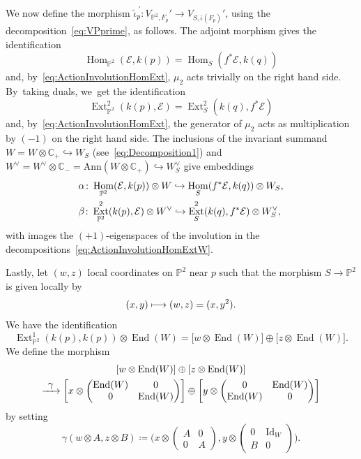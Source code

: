 \documentclass[JEP,XML,SOM,Unicode,published]{cedram}
\newcommand\mto{\mathchoice{\longmapsto}{\mapsto}{\mapsto}{\mapsto}}
\newcommand\hto{\mathrel{\lhook\joinrel\to}}
\newcommand\To[1]{\mathchoice{\xrightarrow{\textstyle\kern4pt#1\kern3pt}}{\stackrel{#1}{\longrightarrow}}{}{}}
\newcommand{\CC}{{\mathbb C}}\let\C\CC
\newcommand{\PP}{{\mathbb P}}\let\P\PP
\newcommand\cE{\mathcal{E}}
\DeclareMathOperator{\End}{End}
\DeclareMathOperator{\Ext}{Ext}
\DeclareMathOperator{\Hom}{Hom}
\DeclareMathOperator{\Id}{Id}
\theoremstyle{definition}
\begin{document}
We now define the morphism $\widetilde{\iota}_p^{\ \prime}\colon V_{\PP^2,F_p}'\to V_{S,\overline{\iota}(F_p)}'$, using the decomposition~\eqref{eq:VPprime}, as follows.
The adjoint morphism gives the identification
\[
\Hom_{\PP^2}(\cE,k(p))=\Hom_{S}(f^*\cE,k(q))
\]
and, by~\eqref{eq:ActionInvolutionHomExt}, $\mu_2$ acts trivially on the right hand side. By~taking duals, we~get the identification
\[
\Ext^2_{\PP^2}(k(p),\cE)=\Ext^2_{S}(k(q),f^*\cE)
\]
and, by~\eqref{eq:ActionInvolutionHomExt}, the generator of $\mu_2$ acts as multiplication by $(-1)$ on the right hand side.
The inclusions of the invariant summand $W=W\otimes\C_+\hookrightarrow W_S$ (see~\eqref{eq:Decomposition1}) and~$W^{\vee}=W^{\vee}\otimes\C_-=\mathrm{Ann}(W\otimes\CC_{+})\hookrightarrow W_S^{\vee}$ give embeddings
\begin{equation}\label{eq:DefOfIotaHatFirstTwoFactors}
\begin{split}
&\alpha\colon \Hom_{\PP^2}(\cE,k(p))\otimes W \hto \Hom_{S}(f^*\cE,k(q))\otimes W_S,\\
&\beta\colon \Ext^2_{\PP^2}(k(p),\cE)\otimes W^\vee\hto \Ext^2_{S}(k(q),f^*\cE)\otimes W_S^\vee,
\end{split}
\end{equation}
with images the $(+1)$-eigenspaces of the involution in the decompositions~\eqref{eq:ActionInvolutionHomExtW}.

Lastly, let $(w,z)$ local coordinates on $\PP^2$ near $p$ such that the morphism $S\to\PP^2$ is given locally by
\[
(x,y)\mto (w,z)=(x,y^2).
\]
We have the identification
\[
\Ext^1_{\PP^2}(k(p),k(p))\otimes \End(W)=\bigl[w\otimes \End(W)\bigr] \oplus \bigl[z\otimes \End(W)\bigr].
\]
We define the morphism
\begin{multline}
\left[w\otimes \End(W)\right] \oplus \left[z\otimes \End(W)\right] \\
\To{\gamma}\left[x \otimes \begin{pmatrix}\End(W)&0\\0&\End(W)\end{pmatrix}\right] \oplus \left[y\otimes \begin{pmatrix}0&\End(W)\\ \End(W)&0\end{pmatrix}\right]
\end{multline}
by setting
\begin{equation}\label{eq:MorphismPhi}
\gamma\left(w\otimes A,z\otimes B\right)\coloneqq\biggl(x \otimes \begin{pmatrix}A&0\\0&A\end{pmatrix},y\otimes \begin{pmatrix}0&\Id_W\\ B&0\end{pmatrix}\biggr).
\end{equation}
\end{document}
